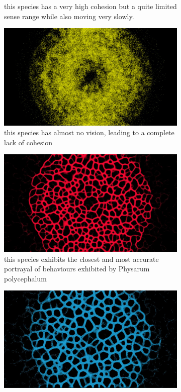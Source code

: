 \documentclass[]{report}
\begin{document}
\begin{figure}
\begin{subfigure}{0.3\textwidth}
        \caption{this species has a very high cohesion but a quite limited sense range while also moving very slowly.}
        \label{fig:EPQ_3}
    \end{subfigure}
    \hfill
    \centering
    \begin{subfigure}{0.3\textwidth}
        \includegraphics[width=0.9\linewidth]{images/EPQ 4.jpg}
        \caption{this species has almost no vision, leading to a complete lack of cohesion}
        \label{fig:EPQ_4}
    \end{subfigure}
    \hfill
    \begin{subfigure}{0.3\textwidth}
        \includegraphics[width=0.9\linewidth]{images/EPQ 5.jpg}
        \caption{this species exhibits the closest and most accurate portrayal of behaviours exhibited by \Gls{Physarum polycephalum}}
        \label{fig:EPQ_5}
    \end{subfigure}
    \hfill
    \begin{subfigure}{0.3\textwidth}
        \includegraphics[width=0.9\linewidth]{images/EPQ 6.jpg}

\end{subfigure}
\end{figure}
\end{document}
